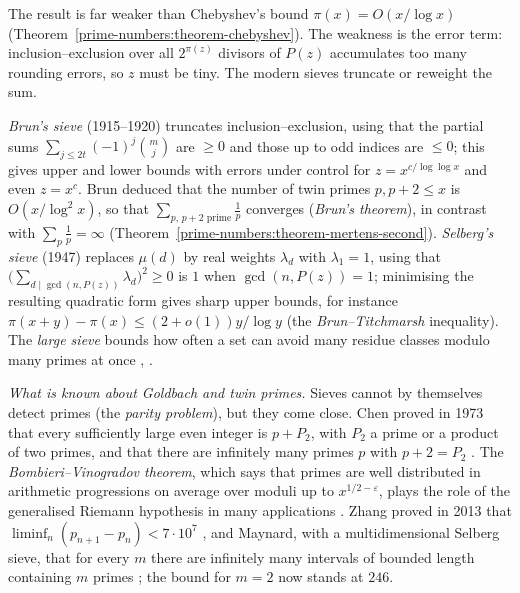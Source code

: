 The result is far weaker than Chebyshev's bound $\pi(x) = O(x/\log x)$ (Theorem~\ref{prime-numbers:theorem-chebyshev}). The weakness is the error term: inclusion--exclusion over all $2^{\pi(z)}$ divisors of
$P(z)$ accumulates too many rounding errors, so $z$ must be tiny. The modern sieves truncate or reweight the sum.

\begin{remark}\label{additive-number-theory:remark-brun-selberg}
\emph{Brun's sieve} (1915--1920) truncates inclusion--exclusion, using that the partial sums $\sum_{j \leq 2t}(-1)^j\binom mj$ are $\geq 0$ and those up to odd indices are $\leq 0$; this gives upper and lower
bounds with errors under control for $z = x^{c/\log\log x}$ and even $z = x^c$. Brun deduced that the number of twin primes $p, p + 2 \leq x$ is $O(x/\log^2x)$, so that
$\sum_{p,\,p+2 \text{ prime}}\frac1p$ converges (\emph{Brun's theorem}), in contrast with $\sum_p\frac1p = \infty$ (Theorem~\ref{prime-numbers:theorem-mertens-second}). \emph{Selberg's sieve} (1947) replaces $\mu(d)$
by real weights $\lambda_d$ with $\lambda_1 = 1$, using that $\bigl(\sum_{d \mid \gcd(n, P(z))}\lambda_d\bigr)^2 \geq 0$ is $1$ when $\gcd(n, P(z)) = 1$; minimising the resulting quadratic form gives sharp upper bounds, for
instance $\pi(x + y) - \pi(x) \leq (2 + o(1))y/\log y$ (the \emph{Brun--Titchmarsh} inequality). The \emph{large sieve} bounds how often a set can avoid many residue classes modulo many primes at once
\cite{iwaniec-kowalski}, \cite{montgomery-vaughan}.
\end{remark}

\begin{remark}\label{additive-number-theory:remark-gaps}
\emph{What is known about Goldbach and twin primes.} Sieves cannot by themselves detect primes (the \emph{parity problem}), but they come close. Chen proved in 1973 that every sufficiently large even
integer is $p + P_2$, with $P_2$ a prime or a product of two primes, and that there are infinitely many primes $p$ with $p + 2 = P_2$ \cite{chen-1973}. The \emph{Bombieri--Vinogradov theorem}, which says that
primes are well distributed in arithmetic progressions on average over moduli up to $x^{1/2 - \varepsilon}$, plays the role of the generalised Riemann hypothesis in many applications
\cite{iwaniec-kowalski}. Zhang proved in 2013 that $\liminf_n(p_{n+1} - p_n) < 7 \cdot 10^7$ \cite{zhang-2014}, and Maynard, with a multidimensional Selberg sieve, that for every $m$ there are infinitely many
intervals of bounded length containing $m$ primes \cite{maynard-2015}; the bound for $m = 2$ now stands at $246$.
\end{remark}

